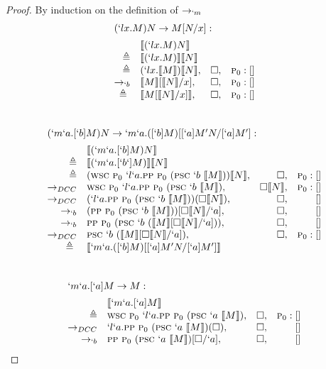 \begin{proof}{By induction on the definition of $\rightarrow_{`m}$}
\[
\begin{array}{rlrl}
  \prooflabel{(`lx.M)N \to M[N/x]:} \\
               & \tr{(`lx.M)N} \\
    \triangleq & \tr{(`lx.M)} \tr{N} \\
    \triangleq & (`lx.\tr{M}) \tr{N}, & \square, & \gp:[] \\
    \tob\   & \tr{M}[\tr{N}/x], & \square, & \gp:[] \\
    \triangleq\ & \tr{M[\tr{N}/x]}, & \square, & \gp:[] \\
\end{array} 
\]
\\
\[
\begin{array}{rlrr}
  \prooflabel{(`m`a.[`b]M)N \to `m`a.([`b]M)[[`a]M^\prime N/[`a]M^\prime]:} \\
             & \tr{(`m`a.[`b]M)N} \\
  \triangleq & \tr{(`m`a.[`b`]M)} \tr{N} \\
  \triangleq & (\wsc\ \gp\ `l`a. \pp\ \gp\ (\psc\ `b\ \tr{M})) \tr{N}, & \square, & \gp:[] \\
  \todcc\ & \wsc\ \gp\ `l`a. \pp\ \gp\ (\psc\ `b\ \tr{M}), & \square \tr{N}, & \gp:[] \\
  \todcc\ & (`l`a. \pp\ \gp\ (\psc\ `b\ \tr{M}))(\square\tr{N}), & \square, & [] \\
  \tob\ & (\pp\ \gp\ (\psc\ `b\ \tr{M}))[\square\tr{N}/`a], & \square, & [] \\
  \tob\ & \pp\ \gp\ (\psc\ `b\ (\tr{M}[\square\tr{N}/`a])), & \square, & [] \\
  \todcc\ & \psc\ `b\ (\tr{M}[\square\tr{N}/`a]), & \square, & \gp:[] \\
  \triangleq\ & \tr{`m`a.([`b]M)[[`a]M^\prime N/[`a]M^\prime]} \\
\end{array} 
\]
\\
\[
\begin{array}{rlrr}
  \prooflabel{`m`a.[`a]M \to M:} \\
              & \tr{`m`a.[`a]M} \\
   \triangleq & \wsc\ \gp\ `l`a.\pp\ \gp\ (\psc\ `a\ \tr{M}), & \square, & \gp:[]  \\
   \todcc\    & `l`a.\pp\ \gp\ (\psc\ `a\ \tr{M})(\square), & \square, & [] \\
   \tob\      & \pp\ \gp\ (\psc\ `a\ \tr{M})[\square/`a], & \square, & [] \\

\end{array}\]
\end{proof}
